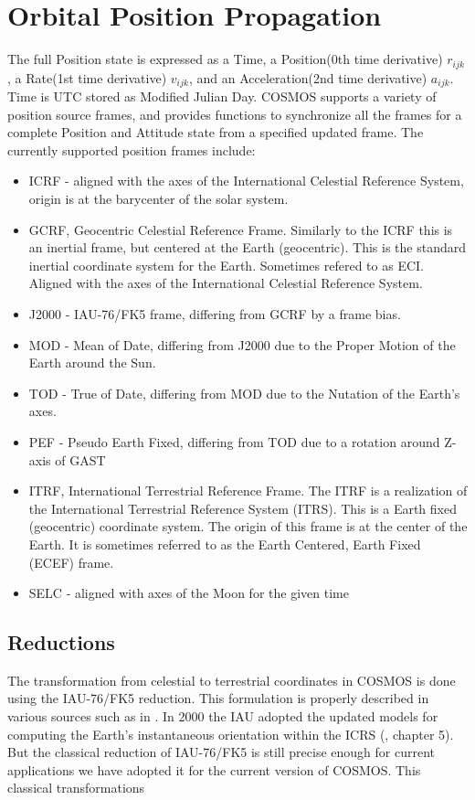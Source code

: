 \documentclass[12pt,letterpaper]{paper}
\begin{document}
\section{Orbital Position Propagation}
The full Position state is expressed as a Time, a Position(0th time derivative) ${r}_{ijk}$, a Rate(1st time derivative) ${v}_{ijk}$, and an Acceleration(2nd time derivative) ${a}_{ijk}$. Time is UTC stored as Modified Julian Day. COSMOS supports a variety of position source frames, and provides functions to synchronize all the frames for a complete Position and Attitude state from a specified updated frame. The currently supported position frames include:
\begin{itemize}
\item ICRF - aligned with the axes of the International Celestial Reference System, origin is at the barycenter of the solar system.
\item GCRF, Geocentric Celestial Reference Frame. Similarly to the ICRF this is an inertial frame, but centered at the Earth (geocentric). This is the standard inertial coordinate system for the Earth. Sometimes refered to as ECI. Aligned with the axes of the International Celestial Reference System.
\item J2000 - IAU-76/FK5 frame, differing from GCRF by a frame bias.
\item MOD - Mean of Date, differing from J2000 due to the Proper Motion of the Earth around the Sun.
\item TOD - True of Date, differing from MOD due to the Nutation of the Earth's axes.
\item PEF - Pseudo Earth Fixed, differing from TOD due to a rotation around Z-axis of GAST
\item ITRF, International Terrestrial Reference Frame. The ITRF is a realization of the International Terrestrial Reference System (ITRS). This is a Earth fixed (geocentric) coordinate system. The origin of this frame is at the center of the Earth. It is sometimes referred to as the Earth Centered, Earth Fixed (ECEF) frame.
\item SELC - aligned with axes of the Moon for the given time
\end{itemize}


\subsection{Reductions}
The transformation from celestial to terrestrial coordinates in COSMOS is done using the IAU-76/FK5 reduction. This formulation is properly described in various sources such as in \cite{Vallado2013,Luzum2010,Vallado2006,Seago2000,Vallado2006a,Capitaine2003,Pottasch1997}. In 2000 the IAU adopted the updated models for computing the Earth's instantaneous orientation within the ICRS (\cite{Luzum2010}, chapter 5). But the classical reduction of IAU-76/FK5 is still precise enough for current applications we have adopted it for the current version of COSMOS. This classical transformations 
\end{document}
